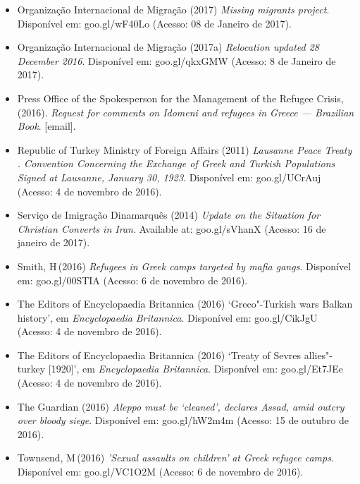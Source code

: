 \begin{itemize}
\item
  Organização Internacional de Migração (2017) \emph{Missing migrants
  project}. Disponível em: goo.gl/wF40Lo (Acesso: 08 de Janeiro de
  2017).
\item
  Organização Internacional de Migração (2017a) \emph{Relocation updated
  28 December 2016}. Disponível em: goo.gl/qkx{GMW} (Acesso: 8 de Janeiro
  de 2017).
\item
  Press Office of the Spokesperson for the Management of the Refugee
  Crisis, (2016). \emph{Request for comments on Idomeni and refugees in
  Greece --- Brazilian Book}. {[}email{]}.
\item
  Republic of Turkey Ministry of Foreign Affairs (2011) \emph{Lausanne
  Peace Treaty . Convention Concerning the Exchange of Greek and
  Turkish Populations Signed at Lausanne, January 30, 1923}. Disponível
  em: goo.gl/{UC}rAuj (Acesso: 4 de novembro de 2016).
\item
  Serviço de Imigração Dinamarquês (2014) \emph{Update on the Situation
  for Christian Converts in Iran}. Available at: goo.gl/sVhanX (Acesso:
  16 de janeiro de 2017).
\item
  Smith, H\,(2016) \emph{Refugees in Greek camps targeted by mafia
  gangs}. Disponível em: goo.gl/00{STIA} (Acesso: 6 de novembro de 2016).
\item
  The Editors of Encyclopaedia Britannica (2016) `Greco"-Turkish wars
  \textbar{} Balkan history', em \emph{Encyclopaedia} \emph{Britannica}.
  Disponível em: goo.gl/CikJgU (Acesso: 4 de novembro de 2016).
\item
  The Editors of Encyclopaedia Britannica (2016) `Treaty of Sevres
  \textbar{} allies"-turkey {[}1920{]}', em \emph{Encyclopaedia
  Britannica}. Disponível em: goo.gl/Et7{JE}e (Acesso: 4 de novembro de
  2016).
\item
  The Guardian (2016) \emph{Aleppo must be}
  \emph{`}\emph{cleaned}\emph{'}\emph{, declares Assad, amid outcry over
  bloody siege}. Disponível em: goo.gl/hW2m4m (Acesso: 15 de outubro de
  2016).
\item
  Townsend, M\,(2016) \emph{'}\emph{Sexual assaults on children}\emph{'}
  \emph{at Greek refugee camps}. Disponível em: goo.gl/{VC}1O2M (Acesso: 6
  de novembro de 2016).
\end{itemize}
\endgroup